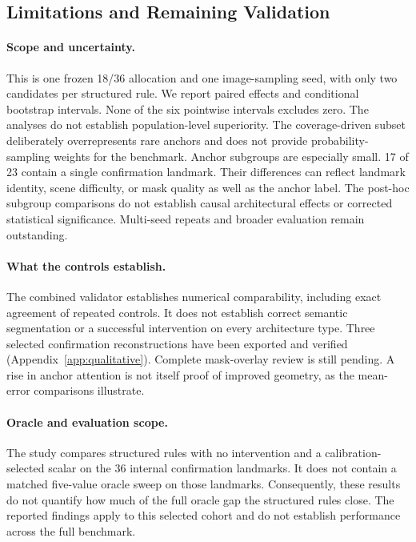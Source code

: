 




\subsection{Limitations and Remaining Validation}
\label{sec:structured-limitations}
\paragraph{Scope and uncertainty.}
This is one frozen 18/36 allocation and one image-sampling seed, with only two candidates per structured rule. We report paired effects and conditional bootstrap intervals. None of the six pointwise intervals excludes zero. The analyses do not establish population-level superiority. The coverage-driven subset deliberately overrepresents rare anchors and does not provide probability-sampling weights for the benchmark. Anchor subgroups are especially small. 17 of 23 contain a single confirmation landmark. Their differences can reflect landmark identity, scene difficulty, or mask quality as well as the anchor label. The post-hoc subgroup comparisons do not establish causal architectural effects or corrected statistical significance. Multi-seed repeats and broader evaluation remain outstanding.

\paragraph{What the controls establish.}
The combined validator establishes numerical comparability, including exact agreement of repeated controls. It does not establish correct semantic segmentation or a successful intervention on every architecture type. Three selected confirmation reconstructions have been exported and verified (Appendix~\ref{app:qualitative}). Complete mask-overlay review is still pending. A rise in anchor attention is not itself proof of improved geometry, as the mean-error comparisons illustrate.

\paragraph{Oracle and evaluation scope.}
The study compares structured rules with no intervention and a calibration-selected scalar on the 36 internal confirmation landmarks. It does not contain a matched five-value oracle sweep on those landmarks. Consequently, these results do not quantify how much of the full oracle gap the structured rules close. The reported findings apply to this selected cohort and do not establish performance across the full benchmark.

